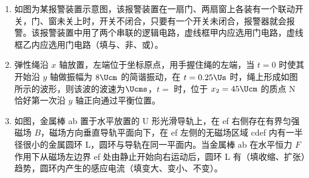\documentclass[\gkver]{gaokaozhenti}
\begin{document}
\begin{enumerate}
\item
如图为某报警装置示意图，该报警装置在一扇门、两扇窗上各装有一个联动开关，门、窗未关上时，开关不闭合，只要有一个开关未闭合，报警器就会报警。该报警装置中用了两个串联的逻辑电路，虚线框甲内应选用门电路，虚线框乙内应选用门电路（填与、非、或）。
\onepicture[align=right, w=6.34cm]{}

\item
弹性绳沿 $x$ 轴放置，左端位于坐标原点，用手握住绳的左端，当 $t = 0$ 时使其开始沿 $y$ 轴做振幅为 $8\Ucm$ 的简谐振动，在 $t = 0.25\Us$ 时，绳上形成如图所示的波形，则该波的波速为$\Ucms$，$t =$ 时，位于 $x_{2} = 45\Ucm$ 的质点 N 恰好第一次沿 $y$ 轴正向通过平衡位置。
\onepicture[align=right, w=5.48cm]{}

\item
如图，金属棒 ab 置于水平放置的 U 形光滑导轨上，在 ef 右侧存在有界匀强磁场 $B$，磁场方向垂直导轨平面向下，在 ef 左侧的无磁场区域 cdef 内有一半径很小的金属圆环 L，圆环与导轨在同一平面内。当金属棒 ab 在水平恒力 $F$ 作用下从磁场左边界 ef 处由静止开始向右运动后，圆环 L 有（填收缩、扩张）趋势，圆环内产生的感应电流（填变大、变小、不变）。
\onepicture[align=right, w=3.44cm]{}


\end{enumerate}
\end{document}
